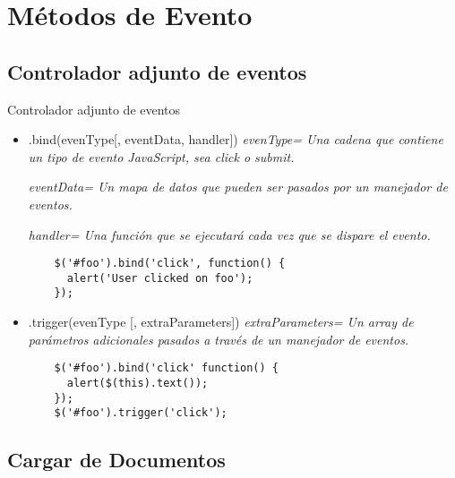 \section{Métodos de Evento} %

\subsection{Controlador adjunto de eventos} %

\begin{frame}[fragile]{Controlador adjunto de eventos} %
\begin{itemize}
    \item .bind(evenType[, eventData, handler]) \textit{ evenType= Una cadena que contiene un tipo de evento JavaScript, sea click o submit.}

    \textit{ eventData= Un mapa de datos que pueden ser pasados por un   manejador de eventos.}

    \textit{ handler= Una función que se ejecutará cada vez que se dispare el
    evento.}
    \begin{lstlisting}
    $('#foo').bind('click', function() {
      alert('User clicked on foo');
    });
    \end{lstlisting}
    \item .trigger(evenType [, extraParameters]) \textit{ extraParameters= Un array de parámetros adicionales pasados a través de un manejador de eventos.} 
    \begin{lstlisting}
    $('#foo').bind('click' function() {
      alert($(this).text());
    });
    $('#foo').trigger('click');
    \end{lstlisting}
\end{itemize}
\end{frame}

\subsection{Cargar de Documentos} %

